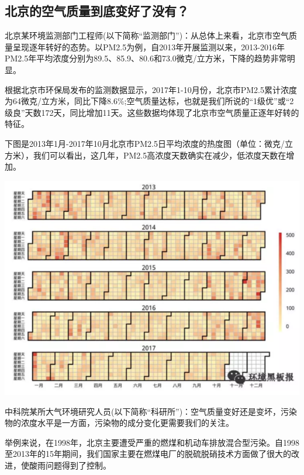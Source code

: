 \documentclass[]{book}
\begin{document}
\hypertarget{ux5317ux4eacux7684ux7a7aux6c14ux8d28ux91cfux5230ux5e95ux53d8ux597dux4e86ux6ca1ux6709}{%
\subsection{北京的空气质量到底变好了没有？}\label{ux5317ux4eacux7684ux7a7aux6c14ux8d28ux91cfux5230ux5e95ux53d8ux597dux4e86ux6ca1ux6709}}

北京某环境监测部门工程师(以下简称``监测部门'')：从总体上来看，北京市空气质量呈现逐年转好的态势。以PM2.5为例，自2013年开展监测以来，2013-2016年PM2.5年平均浓度分别为89.5、85.9、80.6和73.0微克/立方米，下降的趋势非常明显。

根据北京市环保局发布的监测数据显示，2017年1-10月份，北京市PM2.5累计浓度为64微克/立方米，同比下降8.6\%;空气质量达标，也就是我们所说的``1级优''或``2级良''天数172天，同比增加11天。这些数据均体现了北京市空气质量正逐年好转的特征。

下图是2013年1月-2017年10月北京市PM2.5日平均浓度的热度图（单位：微克/立方米），我们可以看出，这几年，PM2.5高浓度天数确实在减少，低浓度天数在增加。

\includegraphics[width=8.33in]{images/air1}

中科院某所大气环境研究人员(以下简称``科研所'')：空气质量变好还是变坏，污染物的浓度水平是一方面，污染物的成分变化更需要我们的关注。

举例来说，在1998年，北京主要遭受严重的燃煤和机动车排放混合型污染。自1998至2013年的15年期间，我们国家主要在燃煤电厂的脱硫脱硝技术方面做了很大的改进，使酸雨问题得到了控制。
\end{document}
